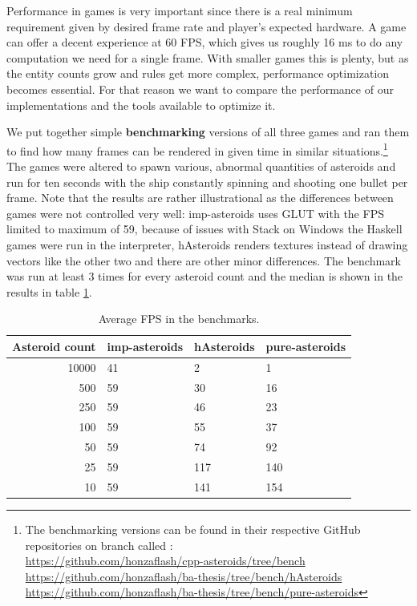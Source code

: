 \documentclass[
  digital, %
  color,   %
  table,   %
  oneside, %
  lof,     %
  lot,     %
]{fithesis3}
\begin{document}
{Performance in games is very important since there is a real minimum requirement
given by desired frame rate and player's expected hardware. A game can offer
a decent experience at 60 FPS, which gives us roughly 16 ms to do any computation
we need for a single frame. With smaller games this is plenty, but as the entity
counts grow and rules get more complex, performance optimization becomes essential.
For that reason we want to compare the performance of our implementations and
the tools available to optimize it.

We put together simple \textbf{benchmarking} versions of all three games and ran them
to find how many frames can be rendered in given time in similar situations.\footnote{
The benchmarking versions can be found in their respective GitHub repositories
on branch called :\\
\url{https://github.com/honzaflash/cpp-asteroids/tree/bench}\\
\url{https://github.com/honzaflash/ba-thesis/tree/bench/hAsteroids}\\
\url{https://github.com/honzaflash/ba-thesis/tree/bench/pure-asteroids}
}
The games were altered to spawn various, abnormal quantities of asteroids and
run for ten seconds with the ship constantly spinning and shooting one bullet per frame.
Note that the results are rather illustrational as the differences between games were not controlled
very well: imp-asteroids uses GLUT with the FPS limited to maximum of 59, because of issues
with Stack on Windows the Haskell games were run in the interpreter, hAsteroids renders
textures instead of drawing vectors like the other two and there are other minor differences.
The benchmark was run at least 3 times for every asteroid count and the median is shown
in the results in table \ref{tab:benchfps}.

\begin{table}
  \begin{tabularx}{\textwidth}{|r|llX|}
    \toprule
    Asteroid count & \textbf{imp-asteroids} & \textbf{hAsteroids} & \textbf{pure-asteroids} \\
    \midrule
    10000 & 41 & 2   & 1   \\
    500   & 59 & 30  & 16    \\
    250   & 59 & 46  & 23    \\
    100   & 59 & 55  & 37 \\
    50    & 59 & 74  & 92 \\
    25    & 59 & 117 & 140 \\
    10    & 59 & 141 & 154 \\
    \bottomrule
  \end{tabularx}
  \caption{Average FPS in the benchmarks.}
  \label{tab:benchfps}
\end{table}

}
\end{document}
